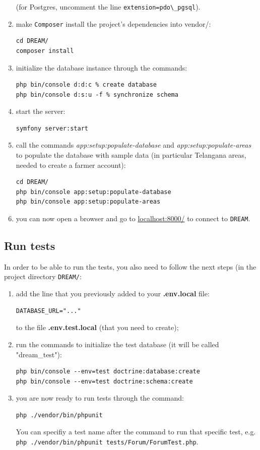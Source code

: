 \documentclass{article}
\begin{document}
\begin{enumerate}
(for Postgres, uncomment the line \verb|extension=pdo\_pgsql|).
    \item make \verb|Composer| install the project's dependencies into vendor/:
    \begin{verbatim}
cd DREAM/
composer install
    \end{verbatim}
\item initialize the database instance through the commands:
    \begin{verbatim}
php bin/console d:d:c % create database
php bin/console d:s:u -f % synchronize schema
    \end{verbatim}
\item start the server:
    \begin{verbatim}
symfony server:start
    \end{verbatim}
    \item call the commands \textit{app:setup:populate-database} and \textit{app:setup:populate-areas} to populate the database with sample data (in particular Telangana areas, needed to create a farmer account):
    \begin{verbatim}
cd DREAM/
php bin/console app:setup:populate-database
php bin/console app:setup:populate-areas
    \end{verbatim}
\item you can now open a browser and go to \url{localhost:8000/} to connect to \verb|DREAM|.
\end{enumerate}
\subsection{Run tests}
In order to be able to run the tests, you also need to follow the next steps (in the project directory \verb|DREAM/|:
\begin{enumerate}
    \item add the line that you previously added to your \textbf{.env.local} file:
\begin{verbatim}
DATABASE_URL="..."
\end{verbatim}
to the file \textbf{.env.test.local} (that you need to create);
\item run the commands to initialize the test database (it will be called "dream\_test"):
\begin{verbatim}
php bin/console --env=test doctrine:database:create
php bin/console --env=test doctrine:schema:create
\end{verbatim}
\item you are now ready to run tests through the command:
\begin{verbatim}
php ./vendor/bin/phpunit
\end{verbatim}
You can specifiy a test name after the command to run that specific test, e.g. \verb|php ./vendor/bin/phpunit tests/Forum/ForumTest.php|.
\end{enumerate}
\newpage
\end{document}
